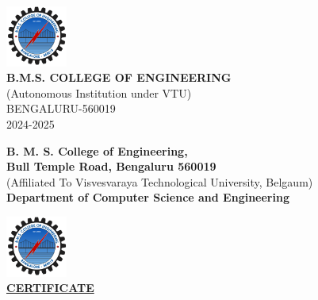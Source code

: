 \documentclass[a4paper,12pt]{article}
\begin{document}
\begin{titlepage}
    \vspace{1cm}
    
    \includegraphics[width=0.15\textwidth]{bmsce.png} \\
    \vspace{0.5cm}
    {\large \textbf{B.M.S. COLLEGE OF ENGINEERING}} \\[0.5em]
    {\large (Autonomous Institution under VTU)} \\[0.5em]
    { BENGALURU-560019} \\[0.5em]
    { 2024-2025} \\
    

\end{titlepage}

\clearpage


    \begin{center}
    
    {\large \textbf{B. M. S. College of Engineering,}}\\[0.25em]
    {\large \textbf{Bull Temple Road, Bengaluru 560019}}\\[0.25em]
    
    (Affiliated To Visvesvaraya Technological University, Belgaum)\\[0.25em]
    \textbf{Department of Computer Science and Engineering}
        

    \vspace{0.75cm}
    \includegraphics[width=0.15\textwidth]{bmsce.png}\\
    \vspace{0.75cm}
    \textbf{\Large \underline{CERTIFICATE}}\\
    \vspace{0.5cm}
    \end{center}
\end{document}
